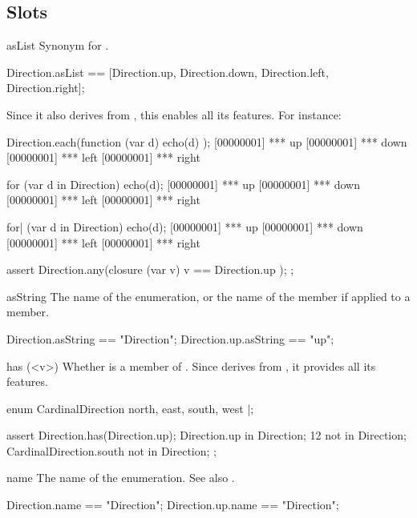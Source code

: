 \subsection{Slots}
\begin{urbiscriptapi}

\item[asList]
  Synonym for .
\begin{urbiassert}
Direction.asList
  == [Direction.up, Direction.down, Direction.left, Direction.right];
\end{urbiassert}

  Since it also derives from , this enables all
  its features.  For instance:

\begin{urbiscript}
Direction.each(function (var d) { echo(d) });
[00000001] *** up
[00000001] *** down
[00000001] *** left
[00000001] *** right

for (var d in Direction)
  echo(d);
[00000001] *** up
[00000001] *** down
[00000001] *** left
[00000001] *** right

for| (var d in Direction)
  echo(d);
[00000001] *** up
[00000001] *** down
[00000001] *** left
[00000001] *** right

assert
{
  Direction.any(closure (var v) { v == Direction.up });
};
\end{urbiscript}

\item[asString]
  The name of the enumeration, or the name of the member if applied to a
  member.
\begin{urbiassert}
Direction.asString    == "Direction";
Direction.up.asString == "up";
\end{urbiassert}

\item[has](<v>)%
  Whether  is a member of \this.  Since 
  derives from , it provides all its features.
\begin{urbiscript}
enum CardinalDirection { north, east, south, west }|;

assert
{
  Direction.has(Direction.up);
  Direction.up in Direction;
  12 not in Direction;
  CardinalDirection.south not in Direction;
};
\end{urbiscript}


\item[name]
  The name of the enumeration.  See also .
\begin{urbiassert}
Direction.name    == "Direction";
Direction.up.name == "Direction";
\end{urbiassert}



\end{urbiscriptapi}
